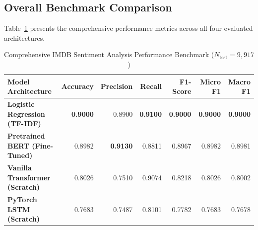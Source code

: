 \documentclass[12pt,a4paper]{report}
\begin{document}
\subsection{Overall Benchmark Comparison}
Table~\ref{tab:exp7_master_benchmark} presents the comprehensive performance metrics across all four evaluated architectures.
\begin{table}[H]
\centering
\small
\caption{Comprehensive IMDB Sentiment Analysis Performance Benchmark ($N_{\text{test}} = 9,917$)}
\label{tab:exp7_master_benchmark}
\begin{tabularx}{\textwidth}{lrrrrrr}
\toprule
\textbf{Model Architecture} & \textbf{Accuracy} & \textbf{Precision} & \textbf{Recall} & \textbf{F1-Score} & \textbf{Micro F1} & \textbf{Macro F1} \\
\midrule
\textbf{Logistic Regression (TF-IDF)} & \textbf{0.9000} & 0.8900 & \textbf{0.9100} & \textbf{0.9000} & \textbf{0.9000} & \textbf{0.9000} \\
\textbf{Pretrained BERT (Fine-Tuned)} & 0.8982 & \textbf{0.9130} & 0.8811 & 0.8967 & 0.8982 & 0.8981 \\
\textbf{Vanilla Transformer (Scratch)} & 0.8026 & 0.7510 & 0.9074 & 0.8218 & 0.8026 & 0.8002 \\
\textbf{PyTorch LSTM (Scratch)} & 0.7683 & 0.7487 & 0.8101 & 0.7782 & 0.7683 & 0.7678 \\
\bottomrule
\end{tabularx}
\end{table}
\end{document}
